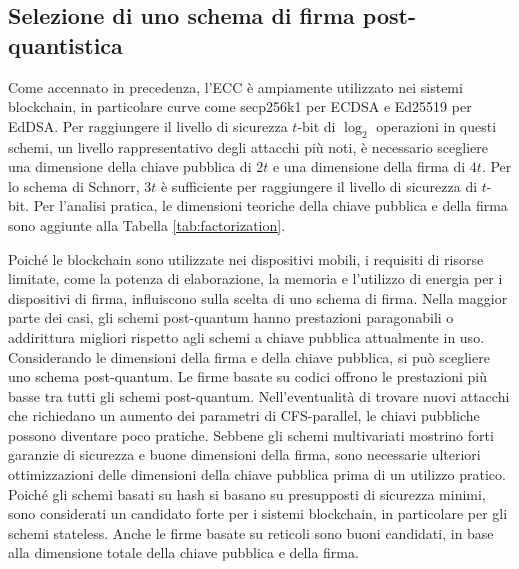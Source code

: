 \begin{table}[]
  \caption{Fattorizzazione e schemi di \(\log\) discreti, con un livello di sicurezza di 128 bit.}
  \label{tab:factorization}
\end{table}

\subsection{Selezione di uno schema di firma post-quantistica}
Come accennato in precedenza, l'ECC è ampiamente utilizzato nei sistemi blockchain, in particolare curve come secp256k1 per ECDSA e Ed25519 per EdDSA. Per raggiungere il livello di sicurezza \(t\)-bit di \(\log_2\) operazioni in questi schemi, un livello rappresentativo degli attacchi più noti, è necessario scegliere una dimensione della chiave pubblica di \(2t\) e una dimensione della firma di \(4t\). Per lo schema di Schnorr, \(3t\) è sufficiente per raggiungere il livello di sicurezza di \(t\)-bit. Per l'analisi pratica, le dimensioni teoriche della chiave pubblica e della firma sono aggiunte alla Tabella \ref{tab:factorization}.

Poiché le blockchain sono utilizzate nei dispositivi mobili, i requisiti di risorse limitate, come la potenza di elaborazione, la memoria e l'utilizzo di energia per i dispositivi di firma, influiscono sulla scelta di uno schema di firma. Nella maggior parte dei casi, gli schemi post-quantum hanno prestazioni paragonabili o addirittura migliori rispetto agli schemi a chiave pubblica attualmente in uso. Considerando le dimensioni della firma e della chiave pubblica, si può scegliere uno schema post-quantum. Le firme basate su codici offrono le prestazioni più basse tra tutti gli schemi post-quantum. Nell'eventualità di trovare nuovi attacchi che richiedano un aumento dei parametri di CFS-parallel, le chiavi pubbliche possono diventare poco pratiche. Sebbene gli schemi multivariati mostrino forti garanzie di sicurezza e buone dimensioni della firma, sono necessarie ulteriori ottimizzazioni delle dimensioni della chiave pubblica prima di un utilizzo pratico. Poiché gli schemi basati su hash si basano su presupposti di sicurezza minimi, sono considerati un candidato forte per i sistemi blockchain, in particolare per gli schemi stateless. Anche le firme basate su reticoli sono buoni candidati, in base alla dimensione totale della chiave pubblica e della firma.


